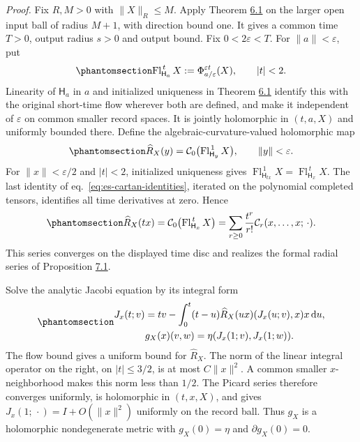 \documentclass[
  english,
  11pt,
  reqno]{amsart}
\begin{document}
\emph{Proof.} Fix \(R,M>0\) with \(\|X\|_R\le M\). Apply Theorem
\hyperref[thm:es-flow]{6.1} on the larger open input ball of radius
\(M+1\), with direction bound one. It gives a common time \(T>0\),
output radius \(s>0\) and output bound. Fix \(0<2\varepsilon<T\). For
\(\|a\|<\varepsilon\), put
\begin{equation}\protect\phantomsection\label{eq:es-rescaled-flow}{
 \operatorname{Fl}_{\mathsf H_a}^{\,t}X
       :=\Phi_{a/\varepsilon}^{\varepsilon t}(X),
       \qquad |t|<2.
}\end{equation} Linearity of \(\mathsf H_a\) in \(a\) and initialized
uniqueness in Theorem \hyperref[thm:es-flow]{6.1} identify this with the
original short-time flow wherever both are defined, and make it
independent of \(\varepsilon\) on common smaller record spaces. It is
jointly holomorphic in \((t,a,X)\) and uniformly bounded there. Define
the algebraic-curvature-valued holomorphic map
\begin{equation}\protect\phantomsection\label{eq:es-analytic-radial-curvature}{
 \widehat R_X(y)=\mathcal C_0\bigl(
           \operatorname{Fl}_{\mathsf H_y}^{\,1}X\bigr),
           \qquad \|y\|<\varepsilon.
}\end{equation} For \(\|x\|<\varepsilon/2\) and \(|t|<2\), initialized
uniqueness gives \(\operatorname{Fl}_{\mathsf H_{tx}}^{\,1}X
 =\operatorname{Fl}_{\mathsf H_x}^{\,t}X\). The last identity of
eq.~\ref{eq:es-cartan-identities}, iterated on the polynomial completed
tensors, identifies all time derivatives at zero. Hence
\begin{equation}\protect\phantomsection\label{eq:es-convergent-radial-curvature}{
 \widehat R_X(tx)
   =\mathcal C_0\bigl(\operatorname{Fl}_{\mathsf H_x}^{\,t}X\bigr)
   =\sum_{r\ge0}\frac{t^r}{r!}
                   \mathcal C_r(x,\ldots,x;\,\cdot).
}\end{equation} This series converges on the displayed time disc and
realizes the formal radial series of Proposition
\hyperref[prop:es-normal-uniqueness]{7.1}.

Solve the analytic Jacobi equation by its integral form
\begin{equation}\protect\phantomsection\label{eq:es-analytic-jacobi}{\begin{gathered}
J_x(t;v)=tv-
    \int_0^t(t-u)\widehat R_X(ux)(J_x(u;v),x)x\,\mathrm du, \\
g_X(x)(v,w)=\eta(J_x(1;v),J_x(1;w)).
\end{gathered}}\end{equation} The flow bound gives a uniform bound for
\(\widehat R_X\). The norm of the linear integral operator on the right,
on \(|t|\le3/2\), is at most \(C\|x\|^2\). A common smaller
\(x\)-neighborhood makes this norm less than \(1/2\). The Picard series
therefore converges uniformly, is holomorphic in \((t,x,X)\), and gives
\(J_x(1;\,\cdot)=I+O(\|x\|^2)\) uniformly on the record ball. Thus
\(g_X\) is a holomorphic nondegenerate metric with \(g_X(0)=\eta\) and
\(\partial g_X(0)=0\).
\end{document}
